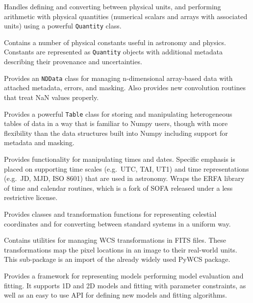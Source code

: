 \documentclass[11pt,twoside]{article}
\begin{document}

Handles defining and converting between physical units, and performing
arithmetic with physical quantities (numerical scalars and arrays with
associated units) using a powerful \texttt{Quantity} class.


Contains a number of physical constants useful in astronomy and physics.
Constants are represented as \texttt{Quantity} objects with additional metadata
describing their provenance and uncertainties.


Provides an \texttt{NDData} class for managing n-dimensional array-based data
with attached metadata, errors, and masking.  Also provides new convolution
routines that treat NaN values properly.


Provides a powerful \texttt{Table} class for storing and manipulating
heterogeneous tables of data in a way that is familiar to Numpy users, though
with more flexibility than the data structures built into Numpy including
support for metadata and masking.

Provides functionality for manipulating times and dates.  Specific emphasis is
placed on supporting time scales (e.g.~UTC, TAI, UT1) and time representations
(e.g.~JD, MJD, ISO 8601) that are used in astronomy.  Wraps the ERFA library of
time and calendar routines, which is a fork of SOFA released under a less
restrictive license.


Provides classes and transformation functions for representing celestial
coordinates and for converting between standard systems in a uniform way.


Contains utilities for managing WCS transformations in FITS files.  These
transformations map the pixel locations in an image to their real-world units.
This sub-package is an import of the already widely used PyWCS package.


Provides a framework for representing models performing model evaluation and
fitting.  It supports 1D and 2D models and fitting with parameter constraints,
as well as an easy to use API for defining new models and fitting algorithms.
\end{document}
